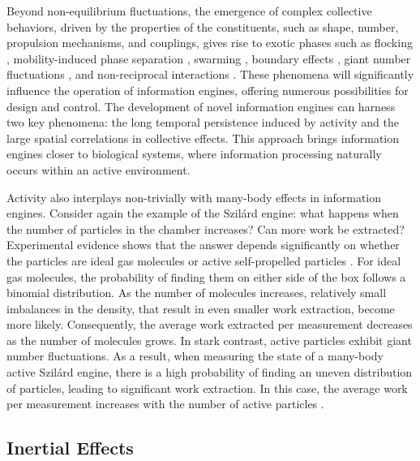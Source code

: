\documentclass[aps, twocolumn,floatfix,showpacs, superscriptaddress]{revtex4-2}
\begin{document}
Beyond non-equilibrium fluctuations, the emergence of complex collective behaviors, driven by the properties of the constituents, such as shape, number, propulsion mechanisms, and couplings, gives rise to exotic phases such as flocking \cite{deseigne2010collective, liebchen2017collective, liebchen2018synthetic}, mobility-induced phase separation \cite{cates2015motility}, swarming \cite{aranson2022bacterial, giomi2013swarming}, boundary effects \cite{deblais2018boundaries}, giant number fluctuations \cite{ramaswamy2003active, ginelli2010large}, and non-reciprocal interactions \cite{loos2020irreversibility, dinelli2023non, fruchart2021non}. 
These phenomena will significantly influence the operation of information engines, offering numerous possibilities for design and control. The development of novel information engines can harness two key phenomena: the long temporal persistence induced by activity and the large spatial correlations in collective effects. This approach brings information engines closer to biological systems, where information processing naturally occurs within an active environment.

Activity also interplays non-trivially with many-body effects in information engines. Consider again the example of the Szil\'ard engine: what happens when the number of particles in the chamber increases? Can more work be extracted? Experimental evidence shows that the answer depends significantly on whether the particles are ideal gas molecules or active self-propelled particles \cite{Chor2023}. For ideal gas molecules, the probability of finding them on either side of the box follows a binomial distribution. As the number of molecules increases, relatively small imbalances in the density, that result in even smaller work extraction, become more likely. Consequently, the average work extracted per measurement decreases as the number of molecules grows.
In stark contrast, active particles exhibit giant number fluctuations. As a result, when measuring the state of a many-body active Szil\'ard engine, there is a high probability of finding an uneven distribution of particles, leading to significant work extraction. In this case, the average work per measurement increases with the number of active particles \cite{Chor2023}.

\subsection{Inertial Effects}
\end{document}

